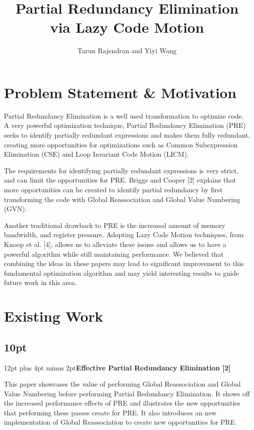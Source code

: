 \documentclass[onecolumn,10pt]{journal}
\author{Tarun Rajendran and Yiyi Wang}
\title{Partial Redundancy Elimination via Lazy Code Motion}
\begin{document}
\maketitle

\section{Problem Statement \& Motivation}
\indent Partial Redundancy Elimination is a well used transformation to optimize code. A very powerful optimization technique, Partial Redundancy Elimination (PRE) seeks to identify partially redundant expressions and makes them fully redundant, creating more opportunities for optimizations such as Common Subexpression Elimination (CSE) and Loop Invariant Code Motion (LICM).
    
    The requirements for identifying partially redundant expressions is very strict, and can limit the opportunities for PRE. Briggs and Cooper [2] explains that more opportunities can be created to identify  partial redundancy by first transforming the code with Global Reassociation and Global Value Numbering (GVN). 

  Another traditional drawback to PRE is the increased amount of memory bandwidth, and register pressure. Adopting Lazy Code Motion techniques, from Knoop et al. [4], allows us to alleviate these issues and allows us to have a powerful algorithm while still maintaining performance. We believed that combining the ideas in these papers may lead to significant improvement to this fundamental optimization algorithm and may yield interesting results to guide future work in this area.

\section{Existing Work}

\noindent\titlespacing\subsection*{10pt}{12pt plus 4pt minus 2pt}\textbf{Effective Partial Redundancy Elimination [2]}

\noindent This paper showcases the value of performing Global Reassociation and Global Value Numbering before performing Partial Redundancy Elimination. It shows off the increased performance effects of PRE and illustrates the new opportunities that performing these passes create for PRE. It also introduces an new implementation of Global Reassociation to create new opportunities for PRE. 
\end{document}
